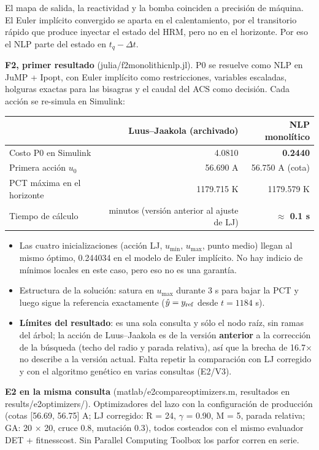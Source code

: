 \documentclass[11pt,a4paper]{article}
\newcommand{\codeus}{\textunderscore\allowbreak}
\newcommand{\code}[1]{{\small\ttfamily\let\_\codeus #1}}
\begin{document}
El mapa de salida, la reactividad y la bomba coinciden a precisión de máquina. El Euler implícito convergido se aparta en el calentamiento, por el transitorio rápido que produce inyectar el estado del HRM, pero no en el horizonte. Por eso el NLP parte del estado en $t_q-\Delta t$.

\textbf{F2, primer resultado} (\code{julia/f2\_monolithic\_nlp.jl}). P0 se resuelve como NLP en JuMP + Ipopt, con Euler implícito como restricciones, variables escaladas, holguras exactas para las bisagras y el caudal del ACS como decisión. Cada acción se re-simula en Simulink:

{\small
\begin{xltabular}{\linewidth}{@{}YRR@{}}
\toprule
\textbf{} & \textbf{Luus–Jaakola (archivado)} & \textbf{NLP monolítico} \\
\midrule
\endhead
Costo P0 en Simulink & 4.0810 & \textbf{0.2440} \\
Primera acción $u_0$ & 56.690 A & 56.750 A (cota) \\
PCT máxima en el horizonte & 1179.715 K & 1179.579 K \\
Tiempo de cálculo & minutos (versión anterior al ajuste de LJ) & \textbf{$\approx$ 0.1 s} \\
\bottomrule
\end{xltabular}}

\begin{itemize}
\item Las cuatro inicializaciones (acción LJ, $u_{\min}$, $u_{\max}$, punto medio) llegan al mismo óptimo, 0.244034 en el modelo de Euler implícito. No hay indicio de mínimos locales en este caso, pero eso no es una garantía.
\item Estructura de la solución: satura en $u_{\max}$ durante 3 s para bajar la PCT y luego sigue la referencia exactamente ($\hat y=y_{\rm ref}$ desde $t=1184$ s).
\item \textbf{Límites del resultado}: es una sola consulta y sólo el nodo raíz, sin ramas del árbol; la acción de Luus–Jaakola es de la versión \textbf{anterior} a la corrección de la búsqueda (techo del radio y parada relativa), así que la brecha de 16.7$\times$ no describe a la versión actual. Falta repetir la comparación con LJ corregido y con el algoritmo genético en varias consultas (E2/V3).
\end{itemize}

\textbf{E2 en la misma consulta} (\code{matlab/e2\_compare\_optimizers.m}, resultados en \code{results/e2\_optimizers\_1180/}). Optimizadores del lazo con la configuración de producción (cotas [56.69, 56.75] A; LJ corregido: R = 24, $\gamma$ = 0.90, M = 5, parada relativa; GA: 20 $\times$ 20, cruce 0.8, mutación 0.3), todos costeados con el mismo evaluador \code{DET\_2} + \code{fitness\_cost}. Sin Parallel Computing Toolbox los \code{parfor} corren en serie.
\end{document}
